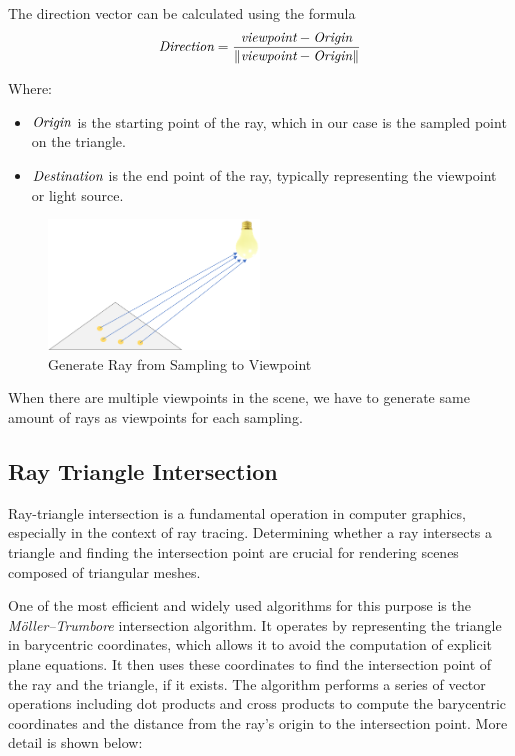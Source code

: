 \documentclass[11pt, a4paper,oneside,chapterprefix=false]{scrbook}
\begin{document}
\vspace{10pt}

The direction vector can be calculated using the formula 
\[
\emph{Direction} = \frac{\emph{viewpoint} - \emph{Origin}}{\|\emph{viewpoint} - \emph{Origin}\|}
\]

Where:
\begin{itemize}
    \item \(\emph{Origin}\) is the starting point of the ray, which in our case is the sampled point on the triangle.
    \item \(\emph{Destination}\) is the end point of the ray, typically representing the viewpoint or light source.
\end{itemize}

\begin{figure}[H]
    \centering
    \includegraphics*[width=0.5\textwidth]{figures/sample to vp.png}
    \caption{Generate Ray from Sampling to Viewpoint}
    \label{fig:generate ray from sampling to viewpoint}
\end{figure}

When there are multiple viewpoints in the scene, we have to generate same amount of rays as viewpoints for each sampling.  

\subsection{Ray Triangle Intersection}

Ray-triangle intersection is a fundamental operation in computer graphics, especially in the context of ray tracing. Determining whether a ray intersects a triangle and finding the intersection point are crucial for rendering scenes composed of triangular meshes.
\vspace{10pt}

One of the most efficient and widely used algorithms for this purpose is the \emph{Möller–Trumbore} \cite{MT:97} intersection algorithm. It operates by representing the triangle in barycentric coordinates, which allows it to avoid the computation of explicit plane equations. It then uses these coordinates to find the intersection point of the ray and the triangle, if it exists. The algorithm performs a series of vector operations including dot products and cross products to compute the barycentric coordinates and the distance from the ray's origin to the intersection point. More detail is shown below:
\end{document}
